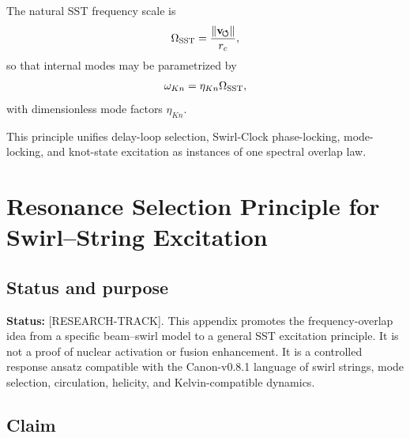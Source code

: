     The natural SST frequency scale is
    \begin{equation}
        \Omega_{\rm SST}
        =
        \frac{\lVert \mathbf{v}_{\!\boldsymbol{\circlearrowleft}}\rVert}{r_c},
    \end{equation}
    so that internal modes may be parametrized by
    \begin{equation}
        \omega_{Kn}
        =
        \eta_{Kn}\Omega_{\rm SST},
    \end{equation}
    with dimensionless mode factors \(\eta_{Kn}\).
    
    This principle unifies delay-loop selection, Swirl-Clock phase-locking,
    mode-locking, and knot-state excitation as instances of one spectral
    overlap law.
    
    
\section{Resonance Selection Principle for Swirl--String Excitation}
    \label{app:resonance-selection-principle}
    
    \subsection*{Status and purpose}
        
        \noindent
        \textbf{Status:} [RESEARCH-TRACK].
        This appendix promotes the frequency-overlap idea from a specific beam--swirl model to a general SST excitation principle. It is not a proof of nuclear activation or fusion enhancement. It is a controlled response ansatz compatible with the Canon-v0.8.1 language of swirl strings, mode selection, circulation, helicity, and Kelvin-compatible dynamics.
    
    \subsection*{Claim}
        
